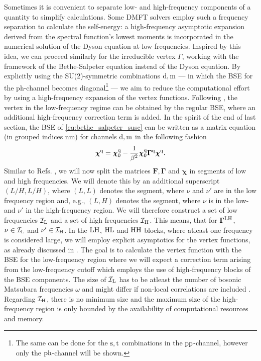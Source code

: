 \documentclass[../../main.tex]{subfiles}
\begin{document}
Sometimes it is convenient to separate low- and high-frequency components of a quantity to simplify calculations. Some DMFT solvers \cite{parragh} employ such a frequency separation to calculate the self-energy: a high-frequency asymptotic expansion derived from the spectral function's lowest moments is incorporated in the numerical solution of the Dyson equation at low frequencies. Inspired by this idea, we can proceed similarly for the irreducible vertex $\Gamma$, working with the framework of the Bethe-Salpeter equation instead of the Dyson equation. By explicitly using the SU(2)-symmetric combinations $\text{d}, \text{m}$ --- in which the BSE for the ph-channel becomes diagonal\footnote{The same can be done for the $\text{s}, \text{t}$ combinations in the $\text{pp}$-channel, however only the $\text{ph}$-channel will be shown.} --- we aim to reduce the computational effort by using a high-frequency expansion of the vertex functions. Following \cite{kunes asympt, hummel DA, efficient BSE}, the vertex in the low-frequency regime can be obtained by the regular BSE, where an additional high-frequency correction term is added. In the spirit of the end of last section, the BSE of \eqref{eq:bethe_salpeter_susc} can be written as a matrix equation (in grouped indices $\text{nm}$) for channels $\text{d}, \text{m}$ in the following fashion
\begin{align}\label{eq:bse_matrix}
	\bm{\chi}^{\text{q}}=\bm{\chi}_{0}^{\text{q}}-\frac{1}{\beta^2} \bm{\chi}_{0}^{\text{q}}\bm{\Gamma}^{\text{q}}\bm{\chi}^{\text{q}}.
\end{align}
Similar to Refs. \cite{kunes, hummel DA, efficient BSE}, we will now split the matrices $\bm{F}, \bm{\Gamma}$ and $\bm{\chi}$ in segments of low and high frequencies. We will denote this by an additional superscript $(L/H, L/H)$, where $(L,L)$ denotes the segment, where $\nu$ and $\nu'$ are in the low frequency region and, e.g., $(L,H)$ denotes the segment, where $\nu$ is in the low- and $\nu'$ in the high-frequency region. We will therefore construct a set of low frequencies $\mathcal{I}_{\text{L}}$ and a set of high frequencies $\mathcal{I}_{\text{H}}$. This means, that for $\bm\Gamma^{\text{L}\text{H}}$, $\nu\in\mathcal{I}_{\text{L}}$ and $\nu'\in\mathcal{I}_{\text{H}}$. In the $\text{L}\text{H}$, $\text{H}\text{L}$ and $\text{H}\text{H}$ blocks, where atleast one frequency is considered large, we will employ explicit asymptotics for the vertex functions, as already discussed in . The goal is to calculate the vertex function with the BSE for the low-frequency region where we will expect a correction term arising from the low-frequency cutoff which employs the use of high-frequency blocks of the BSE components. The size of $\mathcal{I}_{\text{L}}$ has to be atleast the number of bosonic Matsubara frequencies $\omega$ \cite{efficient BSE} and might differ if non-local correlations are included \cite{kinza two-particle corr}. Regarding $\mathcal{I}_{\text{H}}$, there is no minimum size and the maximum size of the high-frequency region is only bounded by the availability of computational resources and memory. 
\end{document}
